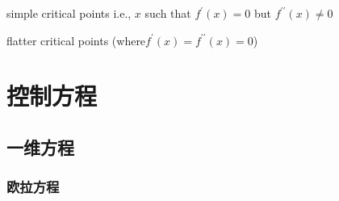 \documentclass{book}
\begin{document}
\begin{definition}
    \cite{WENO-Z-2016}
    simple critical points i.e.,  $x$  such that  $f^{\prime}(x)=0$  but  $f^{\prime \prime}(x) \neq 0$
\end{definition}
\begin{definition}
    \cite{WENO-Z-2016}
    flatter critical points (where$f^{\prime}(x)=f^{\prime \prime}(x)=0$)
\end{definition}


\section{控制方程}
\subsection{一维方程}
\subsubsection{欧拉方程}
\end{document}
